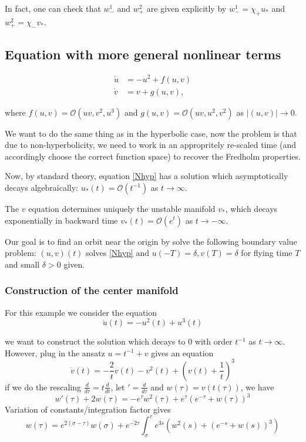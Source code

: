 \documentclass[letterpaper,11pt]{article}
\newcommand{\rmO}{\mathcal{O}}
\numberwithin{equation}{section}
\theoremstyle{plain}
\begin{document}
In fact, one can check that $w_-^1$ and $w_+^2$ are given explicitly by $w_-^1 = \chi_+ u_*$ and $w_+^2 = \chi_- v_*$.

\pagebreak

\subsection{Equation with more general nonlinear terms}
\begin{align}
\dot{u} &= -u^2+f(u,v) \label{Nhyp}\\
\dot{v} &= v +g(u,v) \label{Nhyp2}, 
\end{align}

where $f(u,v)=\rmO(uv,v^2,u^3)$ and $g(u,v) = \rmO(uv,u^2,v^2)$ as $|(u,v)| \to 0$.

We want to do the same thing as in the hyperbolic case, now the problem is that due to non-hyperbolicity, we need to work in an appropritely re-scaled time (and accordingly choose the correct function space) to recover the Fredholm properties.

Now, by standard theory, equation \eqref{Nhyp} has a solution which  asymptotically decays algebraically: $u_*(t) = \rmO(t^{-1})$ as $t\to \infty$. 

The $v$ equation determines uniquely the unstable manifold $v_*$, which decays exponentially in backward time $v_*(t) = \rmO(e^t)$ as $t\to -\infty$.


Our goal is to find an orbit near the origin by solve the following boundary value problem: $(u,v)(t)$ solves \eqref{Nhyp} and $u(-T) = \delta, v(T) = \delta$ for flying time $T$ and small $\delta>0$ given.


\subsubsection{Construction of the center manifold}
For this example we consider the equation 
\[
\dot{u} (t)= -u^2(t) + u^3(t)
\]

we want to construct the solution which decays to $0$ with order $t^{-1}$ as $t \to \infty$. However, plug in the ansatz $u = t^{-1} +v$ gives an equation
\[
\dot{v}(t) = -\frac{2}{t} v(t) -v^2(t)+(v(t)+\frac{1}{t})^3
\]
if we do the rescaling $\frac{d}{d\tau} = t\frac{d}{dt}$, let $' = \frac{d}{d\tau}$ and $w(\tau)=v(t(\tau))$, we have
\[
w'(\tau)+2w(\tau) =- e^\tau w^2(\tau) +e^\tau(e^{-\tau}+w(\tau))^3
\]
Variation of constants/integration factor gives
\[
w(\tau) = e^{2(\sigma-\tau)}w(\sigma)+e^{-2\tau}\int_{\sigma}^{\tau} e^{3s}(w^2(s)+(e^{-s}+w(s))^3)
\]
\end{document}
